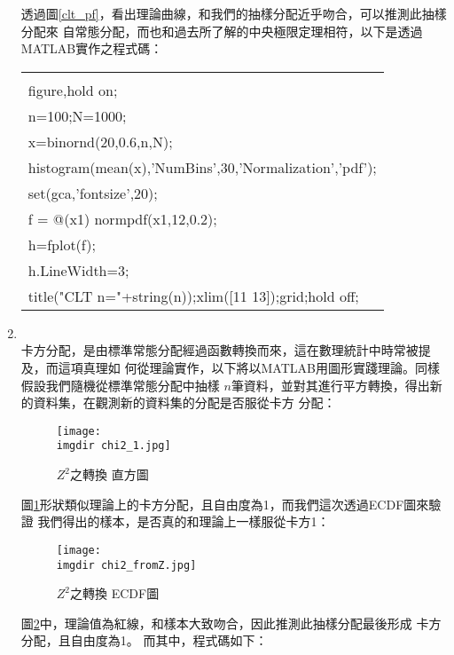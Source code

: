 \begin{enumerate}
{				透過圖\ref{clt_pf}，看出理論曲線，和我們的抽樣分配近乎吻合，可以推測此抽樣分配來					自常態分配，而也和過去所了解的中央極限定理相符，以下是透過MATLAB實作之程式碼：	
				\begin{center}\colorbox{slight}{
					\begin{tabular}{p{}}
						\MJHmarker{\textbf{\color{darkblue}{MATLAB語法 :}}}\\		
						figure,hold on;\\
						n=100;N=1000;\\						
						x=binornd(20,0.6,n,N);\\						
						histogram(mean(x),'NumBins',30,'Normalization','pdf');\\
						set(gca,'fontsize',20);\\
						f = @(x1) normpdf(x1,12,0.2);\\
						h=fplot(f);\\
						h.LineWidth=3;\\
						title("CLT n="+string(n));xlim([11 13]);grid;hold off;\\
					\end{tabular}
					}
				\end{center}				
				\bigskip
			}
			\newpage
			\item{\textbf{}\\
				卡方分配，是由標準常態分配經過函數轉換而來，這在數理統計中時常被提及，而這項真理如					何從理論實作，以下將以MATLAB用圖形實踐理論。同樣假設我們隨機從標準常態分配中抽樣					$n$筆資料，並對其進行平方轉換，得出新的資料集，在觀測新的資料集的分配是否服從卡方					分配：
				\begin{figure}[H]	
		 		 	\centering	 			 	 
   				 	\texttt{[image: \\imgdir chi2\_1.jpg]} 
   			 	 	\caption{$Z^2$之轉換 直方圖}   		
   			 		\label{chi2_1}   			 		 
				\end{figure}
				圖\ref{chi2_1}形狀類似理論上的卡方分配，且自由度為1，而我們這次透過ECDF圖來驗證					我們得出的樣本，是否真的和理論上一樣服從卡方1：
				\begin{figure}[H]	
		 		 	\centering	 			 	 
   				 	\texttt{[image: \\imgdir chi2\_fromZ.jpg]} 
   			 	 	\caption{$Z^2$之轉換 ECDF圖}   		
   			 		\label{chi2_fromZ}   			 		 
				\end{figure}
				圖\ref{chi2_fromZ}中，理論值為紅線，和樣本大致吻合，因此推測此抽樣分配最後形成					卡方分配，且自由度為1。
				而其中，程式碼如下：
				\begin{center}\colorbox{slight}{
}
\end{center}}
\end{enumerate}
